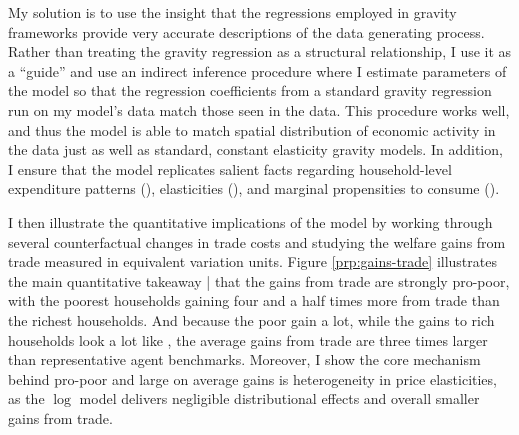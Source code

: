 \documentclass[12pt,pdftex]{article}
\begin{document}
\begin{onehalfspacing}
My solution is to use the insight that the regressions employed in gravity frameworks provide very accurate descriptions of the data generating process. Rather than treating the gravity regression as a structural relationship, I use it as a ``guide'' and use an indirect inference procedure where I estimate parameters of the model so that the regression coefficients from a standard gravity regression run on my model's data match those seen in the data. This procedure works well, and thus the model is able to match spatial distribution of economic activity in the data just as well as standard, constant elasticity gravity models. In addition, I ensure that the model replicates salient facts regarding household-level expenditure patterns (\citet{borusyak2021distributional}), elasticities (\citet{auer2022unequal}), and marginal propensities to consume (\citet{kaplan2022marginal}).

I then illustrate the quantitative implications of the model by working through several counterfactual changes in trade costs and studying the welfare gains from trade measured in equivalent variation units. Figure \ref{prp:gains-trade} illustrates the main quantitative takeaway | that the gains from trade are strongly pro-poor, with the poorest households gaining four and a half times more from trade than the richest households. And because the poor gain a lot, while the gains to rich households look a lot like \citet{arkolakis2012new}, the average gains from trade are three times larger than representative agent benchmarks. Moreover, I show the core mechanism behind pro-poor and large on average gains is heterogeneity in price elasticities, as the $\log$ model delivers negligible distributional effects and overall smaller gains from trade.




\end{onehalfspacing}
\end{document}
